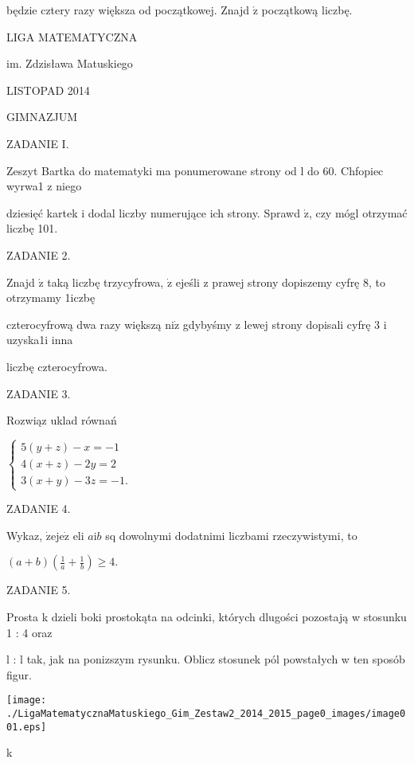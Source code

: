 \documentclass[a4paper,12pt]{article}
\begin{document}
będzie cztery razy większa od początkowej. Znajd $\acute{\mathrm{z}}$ początkową liczbę.






LIGA MATEMATYCZNA

im. Zdzisława Matuskiego

LISTOPAD 2014

GIMNAZJUM

ZADANIE I.

Zeszyt Bartka do matematyki ma ponumerowane strony od l do 60. Chfopiec wyrwa1 z niego

dziesięć kartek i dodal liczby numerujące ich strony. Sprawd $\acute{\mathrm{z}}$, czy mógl otrzymać liczbę 101.

ZADANIE 2.

Znajd $\acute{\mathrm{z}}$ taką liczbę trzycyfrowa, $\dot{\mathrm{z}}$ ejeśli z prawej strony dopiszemy cyfrę 8, to otrzymamy 1iczbę

czterocyfrową dwa razy większą $\mathrm{n}\mathrm{i}\dot{\mathrm{z}}$ gdybyśmy z lewej strony dopisali cyfrę 3 i uzyska1i inna

liczbę czterocyfrowa.

ZADANIE 3.

Rozwiąz uklad równań

$\left\{\begin{array}{l}
5(y+z)-x=-1\\
4(x+z)-2y=2\\
3(x+y)-3z=-1.
\end{array}\right.$

ZADANIE 4.

Wykaz, $\dot{\mathrm{z}}\mathrm{e}\mathrm{j}\mathrm{e}\dot{\mathrm{z}}$ eli $a\mathrm{i}b$ sq dowolnymi dodatnimi liczbami rzeczywistymi, to

$(a+b)(\displaystyle \frac{1}{a}+\frac{1}{b})\geq 4.$

ZADANIE 5.

Prosta k dzieli boki prostokąta na odcinki, których dlugości pozostają w stosunku 1 : 4 oraz

l : l tak, jak na ponizszym rysunku. Oblicz stosunek pól powstałych w ten sposób figur.
\begin{center}
\texttt{[image: ./LigaMatematycznaMatuskiego\_Gim\_Zestaw2\_2014\_2015\_page0\_images/image001.eps]}
\end{center}
k
\end{document}
